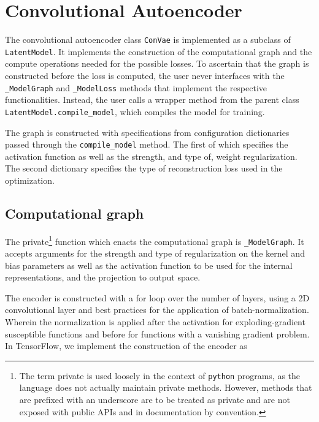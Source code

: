 
\section{Convolutional Autoencoder}\label{sec:convae_implement}

The convolutional autoencoder class \lstinline{ConVae} is implemented as a subclass of \lstinline{LatentModel}. It implements the construction of the computational graph and the compute operations needed for the possible losses. To ascertain that the graph is constructed before the loss is computed, the user never interfaces with the \lstinline{_ModelGraph} and \lstinline{_ModelLoss} methods that implement the respective functionalities. Instead, the user calls a wrapper method from the parent class \lstinline{LatentModel.compile_model}, which compiles the model for training.

The graph is constructed with specifications from configuration dictionaries passed through the \lstinline{compile_model} method. The first of which specifies the activation function as well as the strength, and type of, weight regularization. The second dictionary specifies the type of reconstruction loss used in the optimization.

\subsection{Computational graph}

The private\footnote{The term private is used loosely in the context of \lstinline{python} programs, as the language does not actually maintain private methods. However, methods that are prefixed with an underscore are to be treated as private and are not exposed with public APIs and in documentation by convention.} function which enacts the computational graph is \lstinline{_ModelGraph}. It accepts arguments for the strength and type of regularization on the kernel and bias parameters as well as the activation function to be used for the internal representations, and the projection to output space. 

The encoder is constructed with a for loop over the number of layers, using a 2D convolutional layer and best practices for the application of batch-normalization. Wherein the normalization is applied after the activation for exploding-gradient susceptible functions and before for functions with a vanishing gradient problem. In TensorFlow, we implement the construction of the encoder as 

